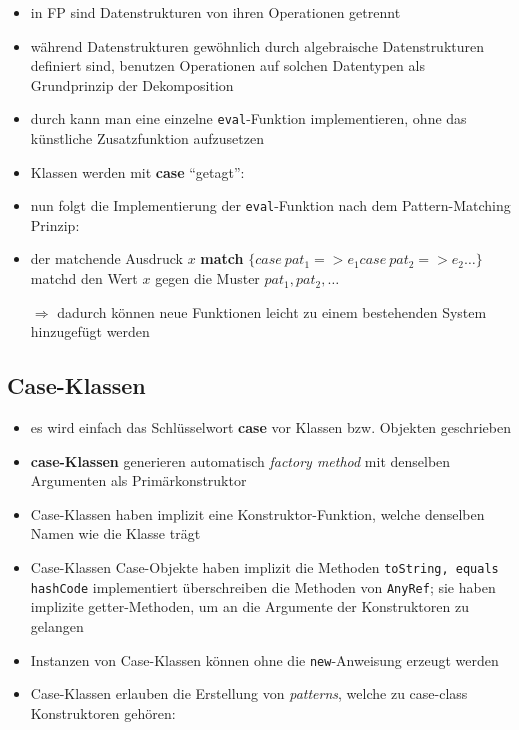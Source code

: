 

\begin{itemize}
  \item in FP sind Datenstrukturen von ihren Operationen getrennt  
  \item während Datenstrukturen gewöhnlich durch algebraische Datenstrukturen
  definiert sind, benutzen Operationen auf solchen Datentypen 
   als Grundprinzip der Dekomposition
  \item durch  kann man eine einzelne 
  \texttt{eval}-Funktion implementieren, ohne das künstliche Zusatzfunktion
  aufzusetzen
  \item Klassen werden mit \textbf{case} \enquote{getagt}:
  
  
  \item nun folgt die Implementierung der \texttt{eval}-Funktion nach dem
  Pattern-Matching Prinzip:
  
  
  
  \item der matchende Ausdruck $x$ \textbf{match} $\{ case\: pat_1 => e_1
  case\: pat_2 => e_2 \ldots \}$ matchd den Wert $x$ gegen die Muster $pat_1, 
  pat_2, \ldots$
  
  
  $\Rightarrow$ dadurch können neue Funktionen leicht zu einem bestehenden
  System hinzugefügt werden
\end{itemize}


\subsection{Case-Klassen}
\begin{itemize}
  \item es wird einfach das Schlüsselwort \textbf{case} vor Klassen bzw. 
  Objekten geschrieben
  \item \textbf{case-Klassen} generieren automatisch 
  \textit{factory method} mit denselben Argumenten als Primärkonstruktor
  \item Case-Klassen haben implizit eine Konstruktor-Funktion, 
  welche denselben Namen wie die Klasse trägt
  \item Case-Klassen \und Case-Objekte haben implizit die Methoden
  \texttt{toString, equals} \und \texttt{hashCode} implementiert \und 
  überschreiben die Methoden von \texttt{AnyRef}; sie haben implizite 
  getter-Methoden, um an die Argumente der Konstruktoren zu gelangen
  \item Instanzen von Case-Klassen können ohne die \texttt{new}-Anweisung
  erzeugt werden
  
    
  
  \item Case-Klassen erlauben die Erstellung von \textit{patterns}, welche
  zu case-class Konstruktoren gehören:
  
  
  
\end{itemize}


